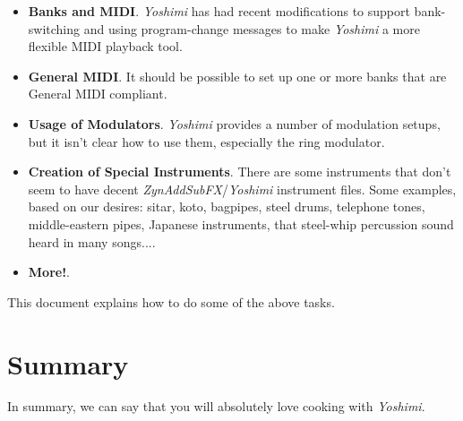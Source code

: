 \documentclass[
 11pt,
 twoside,
 a4paper,
 headinclude,
 footinclude,
 final                                 %
]{article}
\begin{document}
   \begin{itemize}
      \item \textbf{Banks and MIDI}.
         \textsl{Yoshimi} has had recent modifications to support
         bank-switching and using program-change messages to make
         \textsl{Yoshimi} a more flexible MIDI playback tool.
      \item \textbf{General MIDI}.
         It should be possible to set up one or more banks that
         are General MIDI compliant.
      \item \textbf{Usage of Modulators}.
         \textsl{Yoshimi} provides a number of modulation setups,
         but it isn't clear how to use them, especially the ring modulator.
      \item \textbf{Creation of Special Instruments}.
         There are some instruments that don't seem to have
         decent \textsl{ZynAddSubFX}/\textsl{Yoshimi} instrument files.
         Some examples, based on our desires: sitar, koto, bagpipes, steel
         drums, telephone tones, middle-eastern pipes, Japanese instruments,
         that steel-whip percussion sound heard in many songs....
      \item \textbf{More!}.
   \end{itemize}

   This document explains how to do some of the above tasks.


\rhead{\rightmark}         %
















% 

\section{Summary}
\label{sec:summary}

   In summary, we can say that you will absolutely love 
   cooking with \textsl{Yoshimi}.




\printindex
\end{document}
